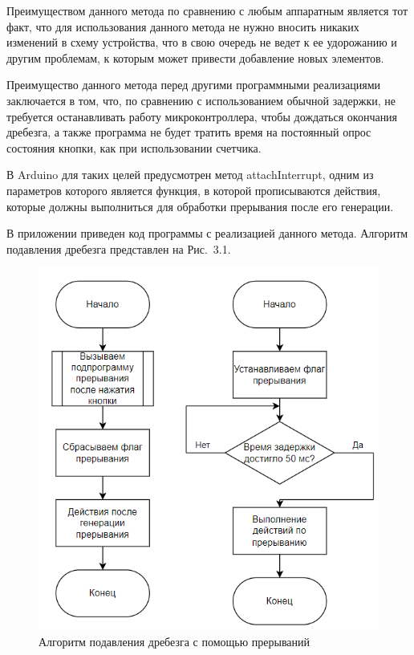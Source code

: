 \documentclass{altsu-report}
\begin{document}
Преимуществом данного метода по сравнению с любым аппаратным является тот факт, что для использования данного метода не нужно вносить никаких изменений в схему устройства, что в свою очередь не ведет к ее удорожанию и другим проблемам, к которым может привести добавление новых элементов.

Преимущество данного метода перед другими программными реализациями заключается в том, что, по сравнению с использованием обычной задержки, не требуется останавливать работу микроконтроллера, чтобы дождаться окончания дребезга, а также программа не будет тратить время на постоянный опрос состояния кнопки, как при использовании счетчика.

В Arduino для таких целей предусмотрен метод attachInterrupt, одним из параметров которого является функция, в которой прописываются действия, которые должны выполниться для обработки прерывания после его генерации.

В приложении приведен код программы с реализацией данного метода. Алгоритм подавления дребезга представлен на Рис.~3.1.

\begin{figure}[H]
    \centering
    \includegraphics[scale=0.6]{algorithm.png}
    \caption{Алгоритм подавления дребезга с помощью прерываний}
    \label{fig:alg}
\end{figure}
\end{document}
